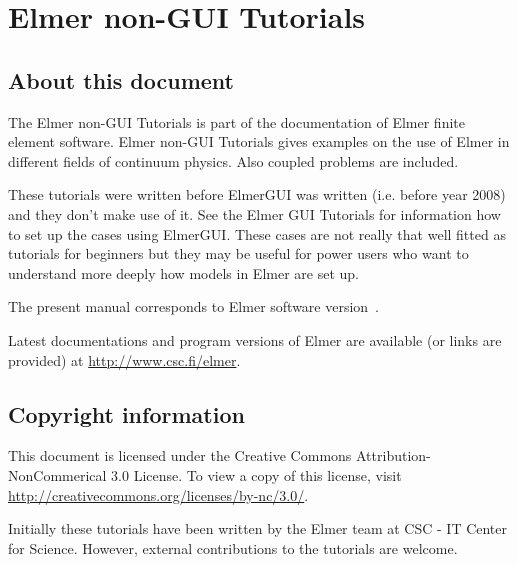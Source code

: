 \chapter*{Elmer non-GUI Tutorials}

\section*{About this document}

The Elmer non-GUI Tutorials is part of the documentation of Elmer finite element software.
Elmer non-GUI Tutorials gives examples on the use of Elmer in different fields
of continuum physics. Also coupled problems are included. 

These tutorials were written before ElmerGUI was written (i.e. before year 2008) and 
they don't make use of it. 
See the Elmer GUI Tutorials for information how to set up the cases using ElmerGUI.
These cases are not really that well fitted as tutorials for beginners but they may be useful 
for power users who want to understand more deeply how models in Elmer are set up. 

The present manual corresponds to Elmer software version~\elmerversion{}.

Latest documentations and program versions of Elmer are available (or links are provided) at 
\url{http://www.csc.fi/elmer}. 

\section*{Copyright information}

This document is licensed under the Creative Commons Attribution-NonCommerical 3.0 License. 
To view a copy of this license, visit \url{http://creativecommons.org/licenses/by-nc/3.0/}.

Initially these tutorials have been written by the Elmer team at CSC - IT Center for Science. 
However, external contributions to the tutorials are welcome. 

